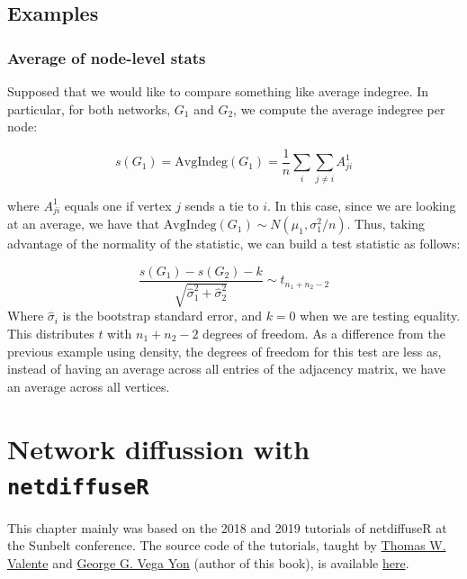 \documentclass[]{book}
\begin{document}
\hypertarget{examples}{%
\section{Examples}\label{examples}}

\hypertarget{average-of-node-level-stats}{%
\subsection{Average of node-level stats}\label{average-of-node-level-stats}}

Supposed that we would like to compare something like average indegree.
In particular, for both networks, \(G_1\) and \(G_2\), we compute the average
indegree per node:

\[
s(G_1) = \mbox{AvgIndeg}(G_1) = \frac{1}{n}\sum_{i}\sum_{j\neq i}A^1_{ji}
\]

\noindent where \(A^1_{ji}\) equals one if vertex \(j\) sends a tie to \(i\). In this
case, since we are looking at an average, we have that
\(\mbox{AvgIndeg}(G_1) \sim N(\mu_1, \sigma^2_1/n)\). Thus, taking advantage of
the normality of the statistic, we can build a test statistic as follows:

\[
\frac{s(G_1) - s(G_2) - k}{\sqrt{\hat\sigma_{1}^2 + \hat\sigma_{2}^2}} \sim t_{n_1 + n_2 - 2}
\]
Where \(\hat\sigma_i\) is the bootstrap standard error, and \(k = 0\) when we are testing
equality. This distributes \(t\) with
\(n_1+n_2-2\) degrees of freedom. As a difference from the previous example using
density, the degrees of freedom for this test are less as, instead of having an
average across all entries of the adjacency matrix, we have an average across all
vertices.

\hypertarget{network-diffussion-with-netdiffuser}{%
\chapter{\texorpdfstring{Network diffussion with \texttt{netdiffuseR}}{Network diffussion with netdiffuseR}}\label{network-diffussion-with-netdiffuser}}

This chapter mainly was based on the 2018 and 2019 tutorials of netdiffuseR
at the Sunbelt conference. The source code of the tutorials, taught by \href{https://keck.usc.edu/faculty-search/thomas-william-valente/}{Thomas W. Valente}
and \href{https://ggvy.cl}{George G. Vega Yon} (author of this book), is available \href{https://github.com/USCCANA/netdiffuser-sunbelt2018/tree/sunbelt2019}{here}.
\end{document}
